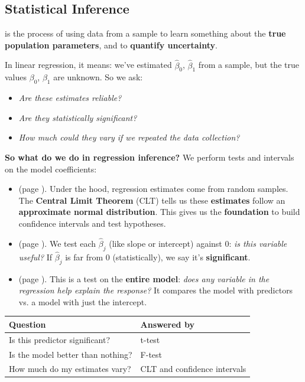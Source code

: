 \subsection{Statistical Inference}

 is the process of using data from a sample to learn something about the \textbf{true population parameters}, and to \textbf{quantify uncertainty}.

\highspace
In linear regression, it means: we've estimated $\hat{\beta}_0$, $\hat{\beta}_1$ from a sample, but the true values $\beta_0$, $\beta_1$ are unknown. So we ask:
\begin{itemize}
    \item \emph{Are these estimates reliable?}
    \item \emph{Are they statistically significant?}
    \item \emph{How much could they vary if we repeated the data collection?}
\end{itemize}
\textcolor{Green3}{ \textbf{So what do we do in regression inference?}} We perform tests and intervals on the model coefficients:
\begin{itemize}
    \item {} (page \pageref{subsubsection: Sampling Distributions and Central Limit Theorem (CLT)}). Under the hood, regression estimates come from random samples. The \textbf{Central Limit Theorem} (CLT) tells us these \textbf{estimates} follow an \textbf{approximate normal distribution}. This gives us the \textbf{foundation} to build confidence intervals and test hypotheses.

    \item {} (page \pageref{subsubsection: t-Test for Individual Coefficients}). We test each $\hat{\beta}_j$ (like slope or intercept) against 0: \emph{is this variable useful?} If $\hat{\beta}_j$ is far from 0 (statistically), we say it's \textbf{significant}.

    \item {} (page \pageref{subsubsection: Global F-Test}). This is a test on the \textbf{entire model}: \emph{does any variable in the regression help explain the response?} It compares the model with predictors vs. a model with just the intercept.
\end{itemize}

\begin{table}[!htp]
    \centering
    \begin{tabular}{@{} l l @{}}
        \toprule
        \textbf{Question} & \textbf{Answered by} \\
        \midrule
        Is this predictor significant?      & t-test \\
        Is the model better than nothing?   & F-test \\
        How much do my estimates vary?      & CLT and confidence intervals \\
        \bottomrule
    \end{tabular}
\end{table}

